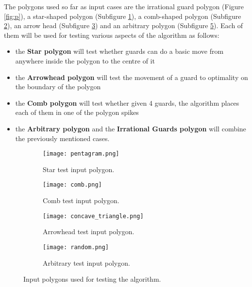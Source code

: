 The polygons used so far as input cases are the irrational guard polygon (Figure \ref{fig:p}), a star-shaped polygon (Subfigure \ref{fig:star}), a comb-shaped polygon (Subfigure \ref{fig:comb}), an arrow head (Subfigure \ref{fig:concave}) and an arbitrary polygon (Subfigure \ref{fig:random}). Each of them will be used for testing various aspects of the algorithm as follows:

\begin{itemize}
    \item the \textbf{Star polygon} will test whether guards can do a basic move from anywhere inside the polygon to the centre of it
    \item the \textbf{Arrowhead polygon} will test the movement of a guard to optimality on the boundary of the polygon
    \item the \textbf{Comb polygon} will test whether given 4 guards, the algorithm places each of them in one of the polygon spikes
    \item the \textbf{Arbitrary polygon} and the \textbf{Irrational Guards polygon} will combine the previously mentioned cases.
\end{itemize}

\begin{figure}
    \centering
    \begin{subfigure}{0.45\textwidth}
        \centering
        \texttt{[image: pentagram.png]}
        \caption{Star test input polygon.}
        \label{fig:star}
    \end{subfigure}
    \begin{subfigure}{0.45\textwidth}
        \centering
        \texttt{[image: comb.png]}
        \caption{Comb test input polygon.}
        \label{fig:comb}
    \end{subfigure}
    \begin{subfigure}{0.45\textwidth}
        \centering
        \texttt{[image: concave\_triangle.png]}
        \caption{Arrowhead test input polygon.}
        \label{fig:concave}
    \end{subfigure}
    \begin{subfigure}{0.45\textwidth}
        \centering
        \texttt{[image: random.png]}
        \caption{Arbitrary test input polygon.}
        \label{fig:random}
    \end{subfigure}
    \caption{Input polygons used for testing the algorithm.}
\end{figure}

